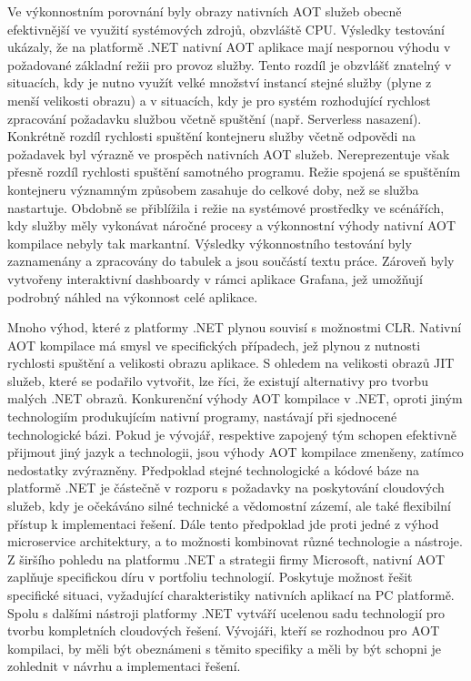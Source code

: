 Ve výkonnostním porovnání byly obrazy nativních AOT služeb obecně efektivnější ve využití systémových zdrojů, obzvláště CPU. Výsledky testování ukázaly, že na platformě .NET nativní AOT aplikace mají nespornou výhodu v požadované základní režii pro provoz služby. Tento rozdíl je obzvlášť znatelný v situacích, kdy je nutno využít velké množství instancí stejné služby (plyne z menší velikosti obrazu) a v situacích, kdy je pro systém rozhodující rychlost zpracování požadavku službou včetně spuštění (např. Serverless nasazení). Konkrétně rozdíl rychlosti spuštění kontejneru služby včetně odpovědi na požadavek byl výrazně ve prospěch nativních AOT služeb. Nereprezentuje však přesně rozdíl rychlosti spuštění samotného programu. Režie spojená se spuštěním kontejneru významným způsobem zasahuje do celkové doby, než se služba nastartuje. Obdobně se přiblížila i režie na systémové prostředky ve scénářích, kdy služby měly vykonávat náročné procesy a výkonnostní výhody nativní AOT kompilace nebyly tak markantní. Výsledky výkonnostního testování byly zaznamenány a zpracovány do tabulek a jsou součástí textu práce. Zároveň byly vytvořeny interaktivní dashboardy v rámci aplikace Grafana, jež umožňují podrobný náhled na výkonnost celé aplikace. 

Mnoho výhod, které z platformy .NET plynou souvisí s možnostmi CLR. Nativní AOT kompilace má smysl ve specifických případech, jež plynou z nutnosti rychlosti spuštění a velikosti obrazu aplikace. S ohledem na velikosti obrazů JIT služeb, které se podařilo vytvořit, lze říci, že existují alternativy pro tvorbu malých .NET obrazů. Konkurenční výhody AOT kompilace v .NET, oproti jiným technologiím produkujícím nativní programy, nastávají při sjednocené technologické bázi. Pokud je vývojář, respektive zapojený tým schopen efektivně přijmout jiný jazyk a technologii, jsou výhody AOT kompilace zmenšeny, zatímco nedostatky zvýrazněny. Předpoklad stejné technologické a kódové báze na platformě .NET je částečně v rozporu s požadavky na poskytování cloudových služeb, kdy je očekáváno silné technické a vědomostní zázemí, ale také flexibilní přístup k implementaci řešení. Dále tento předpoklad jde proti jedné z výhod microservice architektury, a to možnosti kombinovat různé technologie a nástroje. Z širšího pohledu na platformu .NET a strategii firmy Microsoft, nativní AOT zaplňuje specifickou díru v portfoliu technologií. Poskytuje možnost řešit specifické situaci, vyžadující charakteristiky nativních aplikací na PC platformě. Spolu s dalšími nástroji platformy .NET vytváří ucelenou sadu technologií pro tvorbu kompletních cloudových řešení. Vývojáři, kteří se rozhodnou pro AOT kompilaci, by měli být obeznámeni s těmito specifiky a měli by být schopni je zohlednit v návrhu a implementaci řešení.

